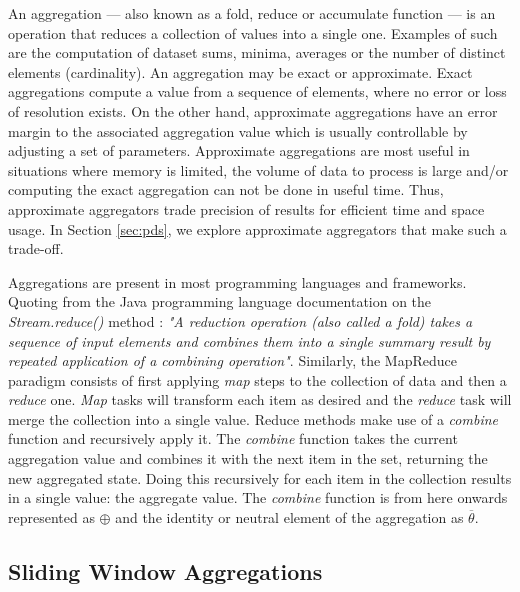 An aggregation --- also known as a fold, reduce or accumulate function --- is an operation that reduces a collection of values into a single one. Examples of such are the computation of dataset sums, minima, averages or the number of distinct elements (cardinality). An aggregation may be exact or approximate. Exact aggregations compute a value from a sequence of elements, where no error or loss of resolution exists. On the other hand, approximate aggregations have an error margin to the associated aggregation value which is usually controllable by adjusting a set of parameters. 
Approximate aggregations are most useful in situations where memory is limited, the volume of data to process is large and/or computing the exact aggregation can not be done in useful time. Thus, approximate aggregators trade precision of results for efficient time and space usage. In Section \ref{sec:pds}, we explore approximate aggregators that make such a trade-off.

Aggregations are present in most programming languages and frameworks. Quoting from the Java programming language documentation on the \textit{Stream.reduce()} method \cite{Java13StreamReduce}: 
\textit{"A reduction operation (also called a fold) takes a sequence of input elements and combines them into a single summary result by repeated application of a combining operation"}. Similarly, the MapReduce \cite{MapReduce} paradigm consists of first applying \textit{map} steps to the collection of data and then a \textit{reduce} one. \textit{Map} tasks will transform each item as desired and the \textit{reduce} task will merge the collection into a single value. Reduce methods make use of a \textit{combine} function and recursively apply it. The \textit{combine} function takes the current aggregation value and combines it with the next item in the set, returning the new aggregated state. Doing this recursively for each item in the collection results in a single value: the aggregate value. The \textit{combine} function is from here onwards represented as $\oplus$ and the identity or neutral element of the aggregation as $\overline{\theta}$.

\subsection{Sliding Window Aggregations}

